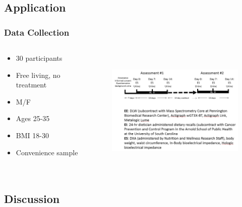 \documentclass[handout]{beamer}\usepackage[]{graphicx}\usepackage[]{color}
\begin{document}
\subsection{Application}

\begin{frame}
\frametitle{Data Collection}
\begin{columns}
\begin{column}{0.3\textwidth}
  \begin{itemize}
  \item
  30 participants
  \item
  Free living, no treatment
  \item
  M/F
  \item
  Ages 25-35
  \item
  BMI 18-30
  \item
  Convenience sample
\end{itemize}
\end{column}
\begin{column}{0.7\textwidth}
\begin{figure}
\centering
\includegraphics[height=6cm,width=8cm]{studydesign}
\end{figure}
\end{column}
\end{columns}

\end{frame}


\subsection{Discussion}

% 
% 
\end{document}
